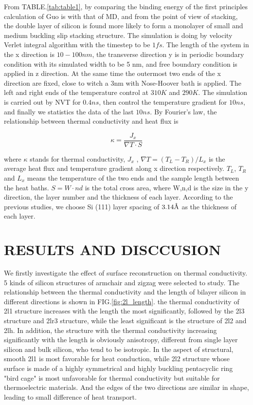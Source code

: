 \documentclass[%
 reprint,
 amsmath,amssymb,
 aps,
 prb,
]{revtex4-1}
\newcommand{\angstrom}{\mbox{\normalfont\AA}}
\begin{document}
From TABLE.\ref{tab:table1}, by comparing the binding energy of the first principles calculation of Guo is with that of MD, and from the point of view of stacking, the double layer of silicon is found more likely to form a monolayer of small and medium buckling slip stacking structure. The simulation is doing by velocity Verlet integral algorithm with the timestep to be $1 fs$. The length of the system in the x direction is $10 - 100nm$, the transverse direction y is in periodic boundary condition with its simulated width to be 5 nm, and free boundary condition is applied in z direction. At the same time the outermost two ends of the x direction are fixed, close to witch a 3nm with Nose-Hoover bath is applied. The left and right ends of the temperature control at $310K$ and $290K$. The simulation is carried out by NVT for $0.4ns$, then control the temperature gradient for $10 ns$, and finally we statistics the data of the last $10ns$. By Fourier's law, the relationship between thermal conductivity and heat flux is

\begin{equation}
  \kappa = \frac{ J_x}{ \nabla T \cdot S} \label{eq_nemd}
\end{equation}

where $\kappa$ stands for thermal conductivity, $J_x$ , $\nabla T=(T_L-T_R)/L_x$ is the average heat flux and temperature gradient along x direction respectively. $T_L$, $T_R$ and $L_x$ means the temperature of the two ends and the sample length between the heat baths. $S=W \cdot nd$ is the total cross area, where W,n,d is the size in the y direction, the layer number and the thickness of each layer. According to the previous studies, we choose Si (111) layer spacing of $3.14 \angstrom$ as the thickness of each layer.



\section{RESULTS AND DISCCUSION}

We firstly investigate the effect of surface reconstruction on thermal conductivity. 5 kinds of silicon structures of armchair and zigzag were selected to study. The relationship between the thermal conductivity and the length of bilayer silicon in different directions is shown in FIG.\ref{fig:2l_length}. the thermal conductivity of 2l1 structure increases with the length the most significantly, followed by the 2l3 structure and 2lr3 structure, while the least significant is the structure of 2l2 and 2lh. In addition, the structure with the thermal conductivity increasing significantly with the length is obviously anisotropy, different from single layer silicon and bulk silicon, who tend to be isotropic. In the aspect of structural, smooth 2l1 is most favorable for heat conduction, while 2l2 structure whose surface is made of a highly symmetrical and highly buckling pentacyclic ring "bird cage" is most unfavorable for thermal conductivity but suitable for thermoelectric materials. And the edges of the two directions are similar in shape, leading to small difference of heat transport.
\end{document}
